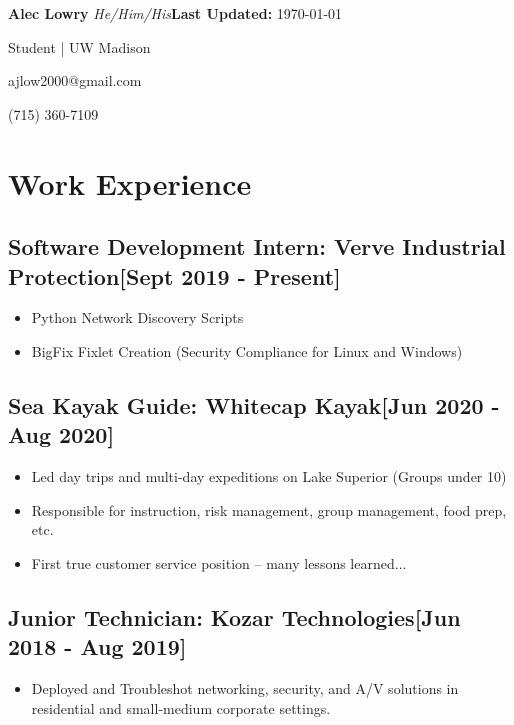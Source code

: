 \documentclass{article}
\begin{document}
\textbf{Alec Lowry} \emph{He/Him/His}\hfill{\textbf{Last Updated:} \today}

Student | UW Madison%

ajlow2000@gmail.com

(715) 360-7109

\section{ Work Experience}

    \subsection{\textbf{Software Development Intern}: Verve Industrial Protection\hfill[Sept 2019 - Present]}
        \begin{itemize}
            \item Python Network Discovery Scripts
            \item BigFix Fixlet Creation (Security Compliance for Linux and Windows)
        \end{itemize}

    \subsection{\textbf{Sea Kayak Guide}: Whitecap Kayak\hfill[Jun 2020 - Aug 2020]}
        \begin{itemize}
            \item Led day trips and multi-day expeditions on Lake Superior (Groups under 10)
            \item Responsible for instruction, risk management, group management, food prep, etc.
            \item First true customer service position -- many lessons learned...
        \end{itemize}

    \subsection{\textbf{Junior Technician}: Kozar Technologies\hfill[Jun 2018 - Aug 2019]}
        \begin{itemize}
            \item Deployed and Troubleshot networking, security, and A/V solutions in residential and small-medium corporate settings.
        \end{itemize}
\end{document}
